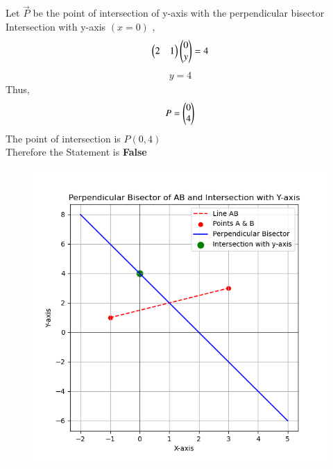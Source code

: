 \documentclass[journal,12pt,onecolumn]{IEEEtran}
\begin{document}
Let $\vec{P}$ be the point of intersection of y-axis with the perpendicular bisector \\
Intersection with y-axis $(x=0)$ ,
\begin{align}
    \begin{pmatrix}2&1\end{pmatrix}\begin{pmatrix}0\\y\end{pmatrix}=4
\end{align}
\begin{align}
	y=4
\end{align}
Thus,
\begin{align}
	P=\begin{pmatrix}0\\4\end{pmatrix}
\end{align}
The point of intersection is $P(0,4)$ \\
Therefore the Statement is \textbf{False}
\begin{figure}[h!]
    \centering
    \includegraphics[height=0.5\textheight, keepaspectratio]{figs/fig.png}
    \label{figure_1}
\end{figure}
\end{document}

